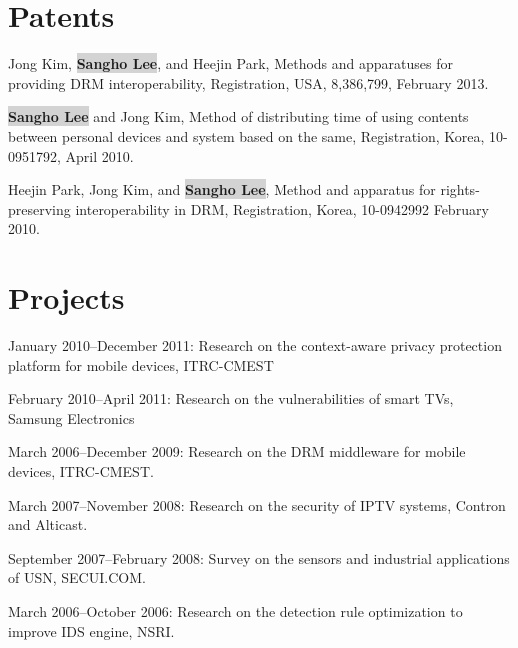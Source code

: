 \documentclass[letterpaper]{article}
\def\name{Sangho Lee}
\newcommand{\myname}{\colorbox{lightgray}{\textbf{\name}}\xspace}
\renewenvironment{itemize}{
  \begin{list}{}{
    \setlength{\leftmargin}{1.5em}
  }
}{
  \end{list}
}
\begin{document}
\section*{Patents}
\begin{itemize}
  \item
 Jong Kim, \myname, and Heejin Park,
 Methods and apparatuses for providing DRM interoperability,
 Registration, USA, 8,386,799,
 February 2013. 
 \item
 \myname and Jong Kim,
 Method of distributing time of using contents between personal devices and system based on the same,
 Registration, Korea, 10-0951792,
 April 2010.
  \item
 Heejin Park, Jong Kim, and \myname,
 Method and apparatus for rights-preserving interoperability in DRM,
 Registration, Korea, 10-0942992
 February 2010. 
\end{itemize}

\section*{Projects}

\begin{itemize}
 \item January 2010--December 2011: Research on the context-aware privacy protection platform for mobile devices, ITRC-CMEST
 \item February 2010--April 2011: Research on the vulnerabilities of smart TVs, Samsung Electronics
 \item March 2006--December 2009: Research on the DRM middleware for mobile devices, ITRC-CMEST.
 \item March 2007--November 2008: Research on the security of IPTV systems, Contron and Alticast.
 \item September 2007--February 2008: Survey on the sensors and industrial applications of USN, SECUI.COM.
 \item March 2006--October 2006: Research on the detection rule optimization to improve IDS engine, NSRI.
\end{itemize}


\end{document}
